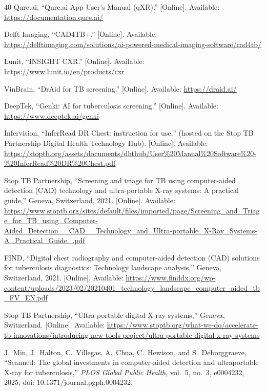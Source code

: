 \documentclass[conference, letterpaper]{IEEEtran}
\begin{document}
\begin{thebibliography}{40}
Qure.ai, ``Qure.ai App User's Manual (qXR).'' [Online]. Available: \url{https://documentation.qure.ai/}

Delft Imaging, ``CAD4TB+.'' [Online]. Available: \url{https://delftimaging.com/solutions/ai-powered-medical-imaging-software/cad4tb/}

Lunit, ``INSIGHT CXR.'' [Online]. Available: \url{https://www.lunit.io/en/products/cxr}

VinBrain, ``DrAid for TB screening.'' [Online]. Available: \url{https://draid.ai/}

DeepTek, ``Genki: AI for tuberculosis screening.'' [Online]. Available: \url{https://www.deeptek.ai/genki}

Infervision, ``InferRead DR Chest: instruction for use,'' (hosted on the Stop TB Partnership Digital Health Technology Hub). [Online]. Available: \url{https://stoptb.org/assets/documents/dhthub/User\%20Manual\%20Software\%20-\%20InferRead\%20DR\%20Chest.pdf}

Stop TB Partnership, ``Screening and triage for TB using computer-aided detection (CAD) technology and ultra-portable X-ray systems: A practical guide,'' Geneva, Switzerland, 2021. [Online]. Available: \url{https://www.stoptb.org/sites/default/files/imported/page/Screening_and_Triage_for_TB_using_Computer-Aided_Detection__CAD__Technology_and_Ultra-portable_X-Ray_Systems-A_Practical_Guide_.pdf}

FIND, ``Digital chest radiography and computer-aided detection (CAD) solutions for tuberculosis diagnostics: Technology landscape analysis,'' Geneva, Switzerland, 2021. [Online]. Available: \url{https://www.finddx.org/wp-content/uploads/2023/02/20210401_technology_landscape_computer_aided_tb_FV_EN.pdf}

Stop TB Partnership, ``Ultra-portable digital X-ray systems,'' Geneva, Switzerland. [Online]. Available: \url{https://www.stoptb.org/what-we-do/accelerate-tb-innovations/introducing-new-tools-project/ultra-portable-digital-x-ray-systems}

J.~Min, J.~Halton, C.~Villegas, A.~Chua, C.~Hewison, and S.~Deborggraeve, ``Scanned: The global investments in computer-aided detection and ultraportable X-ray for tuberculosis,'' \textit{PLOS Global Public Health}, vol.~5, no.~3, e0004232, 2025, doi: 10.1371/journal.pgph.0004232.


\end{thebibliography}
\end{document}
